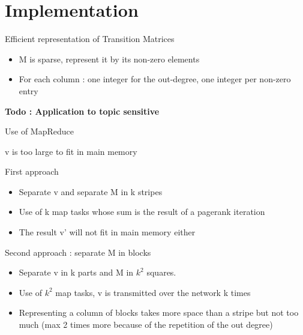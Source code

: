 \documentclass[10pt]{beamer}
\begin{document}
\section{Implementation}
\begin{frame}{Efficient representation of Transition Matrices}
\begin{itemize}
\item M is sparse, represent it by its non-zero elements
\item For each column : one integer for the out-degree, one integer per non-zero entry
\end{itemize}
\textbf{Todo : Application to topic sensitive}
\end{frame}

\begin{frame}{Use of MapReduce}
\begin{center}v  is too large to fit in main memory \end{center}
\begin{block}{First approach}
\begin{itemize}
\item Separate v and separate M in k stripes
\item Use of k map tasks whose sum is the result of a pagerank iteration
\item The result v' will not fit in main memory either
\end{itemize}
\end{block}
\begin{block}{Second approach : separate M in blocks}
\begin{itemize}
\item Separate v in k parts and M in $k^2$ squares.
\item Use of $k^2$ map tasks, v is transmitted over the network k times
\item Representing a column of blocks takes more space than a stripe but not too much (max 2 times more because of the repetition of the out degree)
\end{itemize}
\end{block}
\end{frame}
\end{document}
